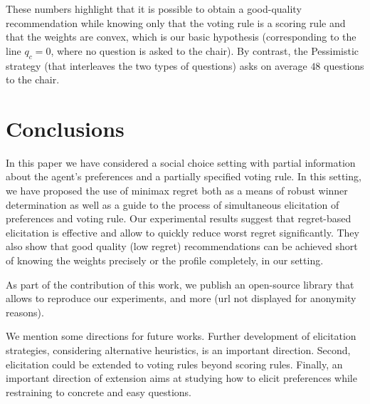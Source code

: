 \documentclass[sigconf, anonymous]{aamas}
\begin{document}
These numbers highlight that it is possible to obtain a good-quality recommendation while knowing only that the voting rule is a scoring rule and that the weights are convex, which is our basic hypothesis (corresponding to the line $q_c = 0$, where no question is asked to the chair). By contrast, the Pessimistic strategy (that interleaves the two types of questions) asks on average $48$ questions to the chair.

\section{Conclusions}  
\label{sec:conclusions}
In this paper we have considered a social choice setting with partial information about the agent's preferences and a partially specified voting rule.
In this setting, we have proposed the use of minimax regret both as a means of robust winner determination as well as a guide to the process of simultaneous elicitation of preferences and voting rule.
Our experimental results %
suggest that regret-based elicitation is effective and allow to quickly reduce worst regret significantly. They also show that good quality (low regret) recommendations can be achieved short of knowing the weights precisely or the profile completely, in our setting.

As part of the contribution of this work, we publish an open-source library that allows to reproduce our experiments, and more (url not displayed for anonymity reasons).

We mention some directions for future works.
Further development of elicitation strategies, considering alternative heuristics, is an important direction. 
Second, elicitation could be extended to voting rules beyond scoring rules. 
Finally, an important direction of extension aims at studying how to elicit preferences while restraining to concrete and easy questions.

\end{document}
